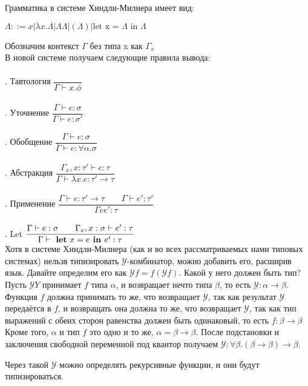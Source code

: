 	 \noindent Грамматика в системе Хиндли-Милнера имеет вид:\\
	 
	 \begin{center}
	 $\Lambda::=x | \lambda x.\Lambda | \Lambda\Lambda | (\Lambda) | \text{let x = }\Lambda \text{ in }\Lambda $ 
	 \end{center}
 		
 	 \noindent Обозначим контекст $\Gamma$ без типа x как $\Gamma_x$\\
 	 В новой системе получаем следующие правила вывода: \\ \\
 	 
 	 . Тавтология $\dfrac{}{\Gamma\vdash x.\phi}$ \\\\
 	
 	 . Уточнение $\dfrac{\Gamma\vdash e:\sigma}{\Gamma\vdash e:\sigma'}$ \\\\
 	 
 	 . Обобщение $\dfrac{\Gamma\vdash e:\sigma}{\Gamma\vdash e:\forall\alpha.\sigma}$ \\ \\
 	 . Абстракция $\dfrac{\Gamma_x, x:\tau'\vdash e:\tau}{\Gamma\vdash \lambda x.e:\tau'\rightarrow\tau}$ \\ \\
 	 . Применение $\dfrac{\Gamma\vdash e:\tau'\rightarrow\tau\qquad\Gamma\vdash e':\tau'}{\Gamma ee':\tau}$ \\ \\
 	 . Let $\dfrac{\Gamma\vdash e:\sigma\qquad\Gamma_x,x:\sigma\vdash e':\tau}{\Gamma\vdash\text{ \textbf{let} } x = e \textbf{ in }e':\tau}$ \\
 	 
 	 Хотя в системе Хиндли-Милнера (как и во всех рассматриваемых нами типовых системах) нельзя типизировать $\mathcal{Y} $-комбинатор,
 	 можно добавить его, расширив язык.
 	 Давайте определим его как $\mathcal{Y} f = f \left(\mathcal{Y} f\right)$.
 	 Какой у него должен быть тип? Пусть $\mathcal{Y}Y$ принимает $f$ типа $\alpha$, и возвращает нечто типа $\beta$,
 	 то есть $\mathcal{Y}: \alpha\to\beta$.
 	 Функция $f$ должна принимать то же, что возвращает $\mathcal{Y}$, так как результат $\mathcal{Y}$ передаётся в $f$,
 	 и возвращать она должна то же, что возвращает $\mathcal{Y}$, так как тип выражений с обеих сторон равенства должен быть одинаковый,
 	 то есть $f : \beta\to\beta$
 	 Кроме того, $\alpha$ и тип $f$ это одно и то же, $\alpha=\beta\to\beta$.
 	 После подстановки и заключения свободной переменной под квантор получаем $\mathcal{Y} : \forall\beta.(\beta\to\beta)\to\beta$.
 	 
 	 Через такой $\mathcal{Y}$ можно определять рекурсивные функции, и они будут типизироваться.
 	 
 
 	 


